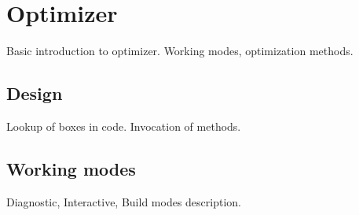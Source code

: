 \chapter{Optimizer}
Basic introduction to optimizer. Working modes, optimization methods.

\section{Design}
Lookup of boxes in code. Invocation of methods.

\section{Working modes}
Diagnostic, Interactive, Build modes description.
